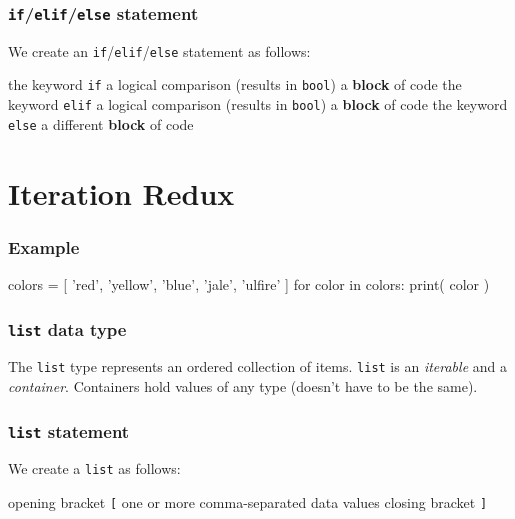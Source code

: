\documentclass[11pt]{beamer}
\begin{document}
\begin{frame}[fragile]
  \frametitle{\texttt{if}/\texttt{elif}/\texttt{else} statement}
  \Enlarge

  \begin{itemize}
  \myitem  We create an \texttt{if}/\texttt{elif}/\texttt{else} statement as follows:
    \begin{itemize}
    \mysubitem  the keyword \texttt{if}
    \mysubitem  a logical comparison (results in \texttt{bool})
    \mysubitem  a \textbf{block} of code
    \mysubitem  the keyword \texttt{elif}
    \mysubitem  a logical comparison (results in \texttt{bool})
    \mysubitem  a \textbf{block} of code
    \mysubitem  the keyword \texttt{else}
    \mysubitem  a different \textbf{block} of code
    \end{itemize}
  \end{itemize}
\end{frame}

\section{Iteration Redux}

\begin{frame}[fragile]
  \frametitle{Example}
  \Enlarge

  \begin{semiverbatim}
colors = [ 'red', 'yellow', 'blue', 'jale', 'ulfire' ]
for color in colors:
    print( color )
  \end{semiverbatim}
\end{frame}

\begin{frame}[fragile]
  \frametitle{\texttt{list} data type}
  \Enlarge

  \begin{itemize}
  \myitem  The \texttt{list} type represents an ordered collection of items. \pause
  \myitem  \texttt{list} is an \emph{iterable} and a \emph{container}. \pause
  \myitem  Containers hold values of any type (doesn't have to be the same).
  \end{itemize}
\end{frame}

\begin{frame}[fragile]
  \frametitle{\texttt{list} statement}
  \Enlarge

  \begin{itemize}
  \myitem  We create a \texttt{list} as follows:
    \begin{itemize}
    \mysubitem  opening bracket \texttt{[}
    \mysubitem  one or more comma-separated data values
    \mysubitem  closing bracket \texttt{]}
    \end{itemize}
  \end{itemize}
\end{frame}
\end{document}

